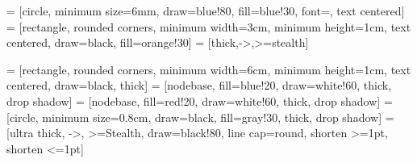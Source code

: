 
\renewcommand{\ttdefault}{pcr}  %

 = [circle, minimum size=6mm, draw=blue!80, fill=blue!30, font=\footnotesize, text centered]
 = [rectangle, rounded corners, minimum width=3cm, minimum height=1cm, text centered, draw=black, fill=orange!30]
 = [thick,->,>=stealth]

 = [rectangle, rounded corners, minimum width=6cm, minimum height=1cm, text centered, draw=black, thick]
 = [nodebase, fill=blue!20, draw=white!60, thick, drop shadow]
 = [nodebase, fill=red!20, draw=white!60, thick, drop shadow]
 = [circle, minimum size=0.8cm, draw=black, fill=gray!30, thick, drop shadow]
 = [ultra thick, ->, >=Stealth, draw=black!80, line cap=round, shorten >=1pt, shorten <=1pt]
